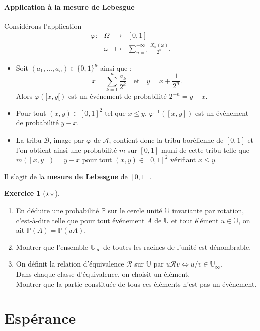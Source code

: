 \documentclass[french]{article}
\renewcommand{\P}{\mathbb{P}}
\newcommand{\U}{\mathbb{U}}
\newcommand{\inv}{^{-1}}
\theoremstyle{plain}
\theoremstyle{definition}
\newtheorem{exo}{Exercice}
\theoremstyle{remark}
\begin{document}
\paragraph{Application à la mesure de Lebesgue}
Considérons l'application $$\begin{array}{lrcl}
	\varphi:&\Omega&\longrightarrow&[0,1]\\
	&\omega&\longmapsto&\displaystyle\sum_{n=1}^{+\infty}\frac{X_n(\omega)}{2^n}.
\end{array}$$
\begin{itemize}
	\item Soit $(a_1,\ldots,a_n)\in\{0,1\}^n$ ainsi que : $$x=\sum_{k=1}^{n}\frac{a_k}{2^k}\quad\text{et}\quad y=x+\frac{1}{2^n}.$$
	Alors $\varphi([x,y[)$ est un événement de probabilité $2^{-n}=y-x$.
	\item Pour tout $(x,y)\in[0,1]^2$ tel que $x\leqslant y$, $\varphi\inv([x,y])$ est un événement de probabilité $y-x$.
	\item La tribu $\mathcal{B}$, image par $\varphi$ de $\mathcal{A}$, contient donc la tribu borélienne de $[0,1]$ et l'on obtient ainsi une probabilité $m$ sur $[0,1]$ muni de cette tribu telle que $m([x,y])=y-x$ pour tout $(x,y)\in[0,1]^2$ vérifiant $x\leqslant y$.
\end{itemize}
Il s'agit de la \textbf{mesure de Lebesgue} de $[0,1]$.

\begin{exo}[$\star\star$]
	\begin{enumerate}
		\item En déduire une probabilité $\P$ sur le cercle unité $\U$ invariante par rotation, c'est-à-dire telle que pour tout événement $A$ de $\U$ et tout élément $u\in\U$, on ait $\P(A)=\P(uA)$.
		\item Montrer que l'ensemble $\U_\infty$ de toutes les racines de l'unité est dénombrable.
		\item On définit la relation d'équivalence $\mathcal{R}$ sur $\U$ par $u\mathcal{R}v\iff u/v\in\U_\infty$.\\
		Dans chaque classe d'équivalence, on choisit un élément.\\
		Montrer que la partie constituée de tous ces éléments n'est pas un événement.
	\end{enumerate}
\end{exo}

\section{Espérance}
\end{document}
